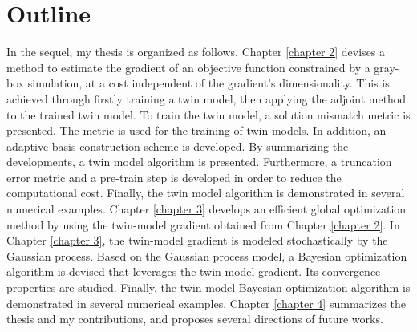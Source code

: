 \section{Outline}
In the sequel, my thesis is organized as follows. Chapter \ref{chapter 2}  devises a method to estimate the gradient of an
objective function constrained by a gray-box simulation, at a cost independent of the gradient's dimensionality. 
This is achieved through firstly training a twin model, then applying the adjoint method to the trained twin model.
To train the twin model, a solution mismatch metric is presented. The metric
is used for the training of twin models.  In addition, an adaptive basis construction scheme 
is developed. By summarizing the developments, a twin model algorithm is presented. Furthermore,
a truncation error metric and a pre-train step is developed in order to reduce the computational cost.
Finally, the twin model algorithm is demonstrated in several numerical examples.
Chapter \ref{chapter 3} develops an efficient global optimization method by using the twin-model gradient obtained
from Chapter \ref{chapter 2}.
In Chapter \ref{chapter 3}, the twin-model gradient is modeled stochastically by the Gaussian process.
Based on the Gaussian process model, 
a Bayesian optimization algorithm is devised that leverages the twin-model gradient.
Its convergence properties are studied. Finally, the twin-model Bayesian optimization algorithm
is demonstrated in several numerical examples. Chapter \ref{chapter 4} summarizes the thesis and
my contributions, and proposes several directions of future works.

